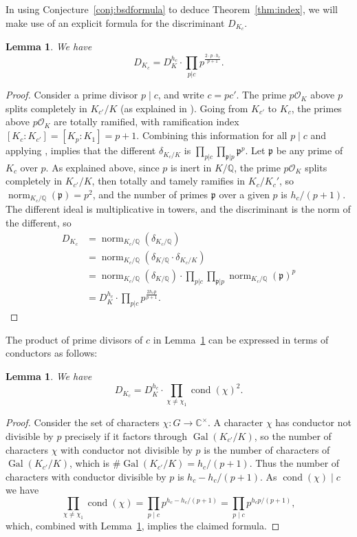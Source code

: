 \documentclass[preprint,12pt]{elsarticle}
\newcommand{\p}{\mathfrak{p}}
\newcommand{\Q}{\mathbb{Q}}
\newcommand{\C}{\mathbb{C}}
\newcommand{\cO}{\mathcal{O}}
\DeclareMathOperator{\Gal}{Gal}
\DeclareMathOperator{\norm}{norm}
\DeclareMathOperator{\cond}{cond}
\theoremstyle{plain}
\newtheorem{lemma}[theorem]{Lemma}
\theoremstyle{definition}
\begin{document}
In using Conjecture~\ref{conj:bsdformula} to deduce Theorem~\ref{thm:index},
we will make use of an explicit formula for the discriminant $D_{K_c}$.
\begin{lemma}\label{lem:disc}
We have
   $$D_{K_c} = D_K^{h_c} \cdot \prod_{p|c} {p^{\frac{2\cdot p\cdot h_c}{p+1}}}.$$
\end{lemma}
\begin{proof}
  Consider a prime divisor $p\mid c$, and write $c=pc'$. The prime
  $p\cO_K$ above $p$ splits completely in $K_{c'}/K$ (as explained in
  \cite[Lem.~5.3]{stein:ggz}).  Going from $K_{c'}$ to $K_c$, the
  primes above $p\cO_K$ are totally ramified, with ramification index
  $[K_c:K_{c'}] = [K_p:K_1] = p+1$.  Combining this information for all $p\mid c$
  and applying \cite[Thm.~26, Ch.~III]{frohlich-taylor}, implies that
  the different $\delta_{K_c/K}$ is $\prod_{p|c} \prod_{\p|p} \p^p$.
  Let $\p$ be any prime of $K_c$ over $p$.  As explained above, since $p$ is inert in
  $K/\Q$, the prime $p\cO_K$ splits completely in $K_{c'}/K$, then
  totally and tamely ramifies in $K_c/K_c'$, so $\norm_{K_c/\Q}(\p) = p^2$,
  and the number of primes $\p$ over a given $p$ is $h_c/(p+1)$.
  The different ideal is multiplicative in towers, and the
  discriminant is the norm of the different, so
\begin{align*}
D_{K_c} &= \norm_{K_c/\Q}(\delta_{K_c/\Q})\\
&= \norm_{K_c/\Q}(\delta_{K/\Q} \cdot \delta_{K_c/K}) \\
&= 
   \norm_{K_c/\Q}(\delta_{K/\Q}) \cdot \prod_{p|c} \prod_{\p|p} \norm_{K_c/\Q}(\p)^p\\
&= D_{K}^{h_c} \cdot \prod_{p|c} {p^{\frac{2h_cp}{p+1}}}.
\end{align*}
\end{proof}

The product of prime divisors of $c$ in Lemma~\ref{lem:disc} can be expressed in terms of conductors as follows:
\begin{lemma}\label{lem:discKc}
We have
\begin{equation}
\label{cancel_disc}
D_{K_c} = D_K^{h_c} \cdot  \prod_{\chi \ne \chi_1} \cond(\chi)^2.
\end{equation}
\end{lemma}
\begin{proof}
Consider the set of characters $\chi : G \rightarrow
\C^\times$.  A character $\chi$ has conductor not divisible by $p$ precisely if
it factors through $\Gal(K_{c'}/K)$, so
the number of characters $\chi$ with conductor not divisible by $p$
is the number of characters of $\Gal(K_{c'}/K)$, which is $\#\Gal(K_{c'}/K) = h_c/(p+1)$.
Thus the number of characters with conductor divisible by $p$ is
$h_c - h_c/(p+1)$.   As $\cond(\chi) \mid c$ we have 
$$
  \prod_{\chi \ne \chi_1} \cond(\chi) = \prod_{p\mid c} p^{h_c-h_c/(p+1)} 
     = \prod_{p\mid c} p^{h_cp/(p+1)},
$$ 
which, combined with Lemma~\ref{lem:disc}, implies the claimed formula.
\end{proof}
\end{document}
